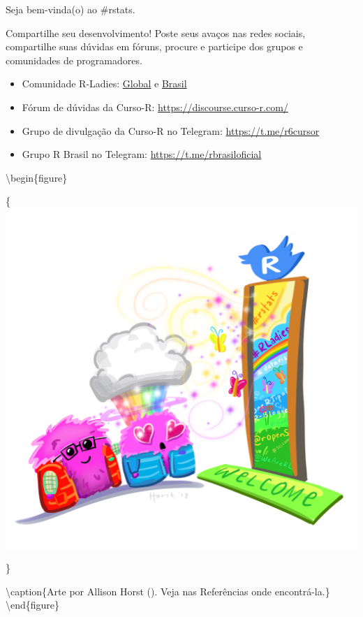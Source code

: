 \documentclass[
]{book}
\begin{document}
Seja bem-vinda(o) ao \#rstats.

Compartilhe seu desenvolvimento! Poste seus avaços nas redes sociais, compartilhe suas dúvidas em fóruns, procure e participe dos grupos e comunidades de programadores.

\begin{itemize}
\item
  Comunidade R-Ladies: \href{https://benubah.github.io/r-community-explorer/rladies.html}{Global} e \href{https://github.com/R-Ladies-Sao-Paulo/RLadies-Brasil\#readme}{Brasil}
\item
  Fórum de dúvidas da Curso-R: \url{https://discourse.curso-r.com/}
\item
  Grupo de divulgação da Curso-R no Telegram: \url{https://t.me/r6cursor}
\item
  Grupo R Brasil no Telegram: \url{https://t.me/rbrasiloficial}
\end{itemize}

\textbackslash begin\{figure\}

\{\centering \includegraphics[width=27.9in]{assets/img/welcome_to_rstats_twitter}

\}

\textbackslash caption\{Arte por Allison Horst (\citet{allison_horst}). Veja nas Referências onde encontrá-la.\}\label{fig:allison-twitter}
\textbackslash end\{figure\}
\end{document}

